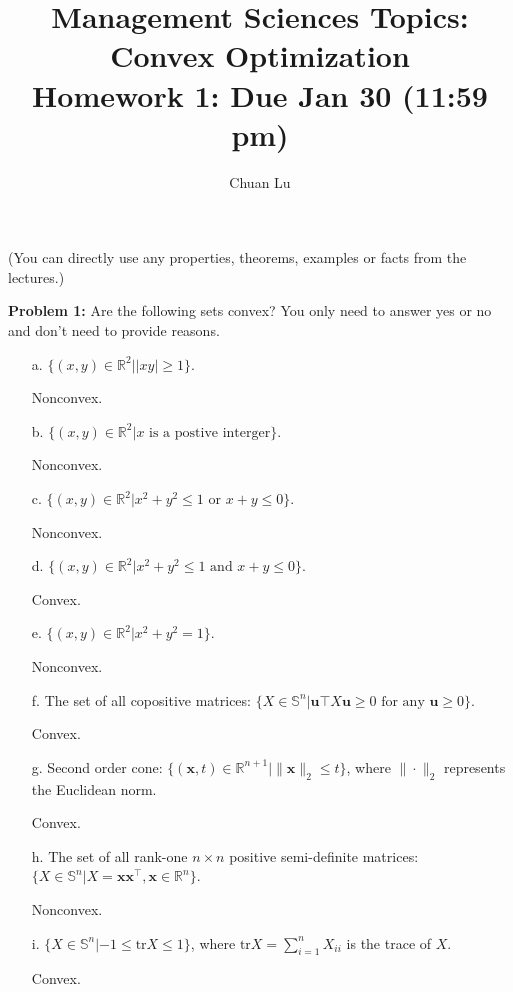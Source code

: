 \documentclass{article}
\newcommand{\bx}{{\mathbf x}}
\newcommand{\bu}{{\mathbf u}}
\begin{document}
\title{Management Sciences Topics: Convex Optimization\\ Homework 1: Due Jan 30 (11:59 pm) }
\author{Chuan Lu}
\date{}

\maketitle
\noindent(You can directly use any properties, theorems, examples or facts from the lectures.)
\bigskip

\noindent\textbf{Problem 1:} Are the following sets convex? You only need to answer yes or no and don't need to provide reasons.
\begin{enumerate}
	\item[a.] $\{(x,y)\in\mathbb{R}^2||xy|\geq 1\}$.

	Nonconvex.

	\item[b.] $\{(x,y)\in\mathbb{R}^2|x\text{ is a postive interger}\}$.

	Nonconvex.

	\item[c.] $\{(x,y)\in\mathbb{R}^2|x^2+y^2\leq1\text{ or }x+y\leq 0\}$.

	Nonconvex.

	\item[d.] $\{(x,y)\in\mathbb{R}^2|x^2+y^2\leq1\text{ and }x+y\leq 0\}$.

	Convex.
	\item[e.] $\{(x,y)\in\mathbb{R}^2|x^2+y^2=1\}$.

	Nonconvex.

	\item[f.] The set of all copositive matrices:  $\{X\in\mathbb{S}^n|\bu\top X\bu\geq0 \text{ for any }\bu\geq0\}$.

	Convex.
	\item[g.] Second order cone:  $\{(\bx,t)\in\mathbb{R}^{n+1}|\|\bx\|_2\leq t\}$, where $\|\cdot\|_2$ represents the Euclidean norm.

	Convex.
	\item[h.] The set of all rank-one $n\times n$ positive semi-definite matrices: $\{X\in\mathbb{S}^n|X=\bx\bx^{\top},\bx\in\mathbb{R}^n\}$.

	Nonconvex.
	\item[i.] $\{X\in\mathbb{S}^n|-1\leq\text{tr}{X}\leq 1\}$, where $\text{tr}{X}=\sum_{i=1}^{n}X_{ii}$ is the trace of $X$.

	Convex.
\end{enumerate}
\bigskip
\end{document}
